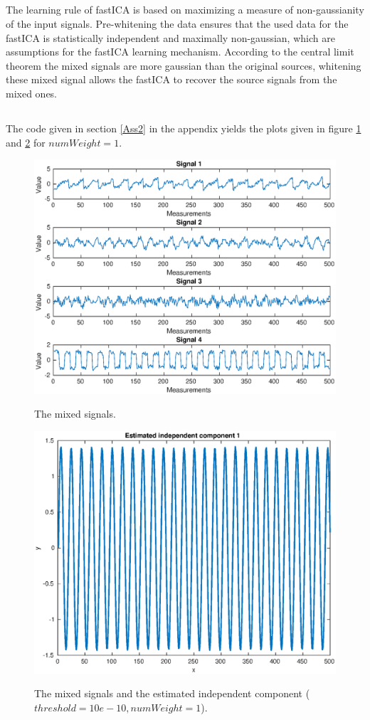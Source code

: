 \documentclass[10pt]{article}
\begin{document}
\subsection{}
The learning rule of fastICA is based on maximizing a measure of non-gaussianity of the input signals. Pre-whitening the data ensures that the used data for the fastICA is statistically independent and maximally non-gaussian, which are assumptions for the fastICA learning mechanism. According to the central limit theorem the mixed signals are more gaussian than the original sources, whitening these mixed signal allows the fastICA to recover the source signals from the mixed ones. 

\subsection{}
The code given in section \ref{Ass2} in the appendix yields the plots given in figure \ref{fig2.1} and \ref{fig2.2} for $numWeight = 1$.
\begin{figure}
  \centering
  \caption{The mixed signals.}
    \includegraphics[width=\columnwidth]{Ass3a.eps}
  \label{fig2.1}
\end{figure}
\begin{figure}
  \centering
  \caption{The mixed signals and the estimated independent component ($threshold = 10e-10, numWeight = 1$).}
    \includegraphics[width=.6\columnwidth]{Ass2b.eps}
  \label{fig2.2}
\end{figure}
\end{document}
